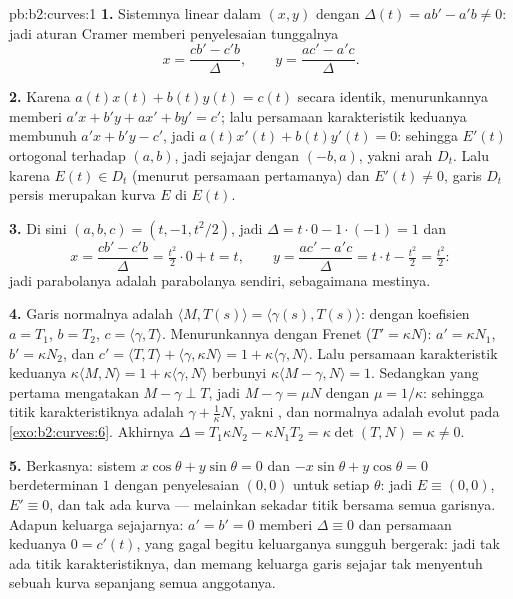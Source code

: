 \begin{solution}{pb:b2:curves:1}
\textbf{1.} Sistemnya linear dalam $(x, y)$ dengan 
$\Delta(t) = a b' - a'b \neq 0$: jadi aturan Cramer memberi
penyelesaian tunggalnya
\[
x = \frac{c b' - c' b}{\Delta}, \qquad
y = \frac{a c' - a' c}{\Delta}.
\]

\textbf{2.} Karena $a(t)x(t) + b(t)y(t) = c(t)$ secara identik,
menurunkannya memberi $a'x + b'y + ax' + by' = c'$; lalu
persamaan karakteristik keduanya membunuh $a'x + b'y - c'$, jadi
$a(t)x'(t) + b(t)y'(t) = 0$: sehingga $E'(t)$ ortogonal terhadap $(a,
b)$, jadi sejajar dengan $(-b, a)$, yakni arah $D_t$. Lalu karena
$E(t) \in D_t$ (menurut persamaan pertamanya) dan $E'(t) \neq 0$, garis
$D_t$ persis merupakan  kurva $E$ di $E(t)$.

\textbf{3.} Di sini $(a, b, c) = (t, -1, t^2/2)$, jadi $\Delta =
t\cdot0 - 1\cdot(-1) = 1$ dan
\[
x = \frac{c b' - c' b}{\Delta} = \tfrac{t^2}2\cdot 0 +
t = t, \qquad
y = \frac{a c' - a' c}{\Delta} = t\cdot t - \tfrac{t^2}2 =
\tfrac{t^2}2 :
\]
jadi   parabolanya adalah
parabolanya sendiri, sebagaimana mestinya.

\textbf{4.} Garis normalnya adalah $\langle M, T(s)\rangle =
\langle\gamma(s), T(s)\rangle$: dengan koefisien $a = T_1$, $b =
T_2$, $c = \langle\gamma, T\rangle$. Menurunkannya dengan
Frenet ($T' = \kappa N$): $a' = \kappa N_1$, $b' = \kappa
N_2$, dan $c' = \langle T, T\rangle + \langle\gamma, \kappa
N\rangle = 1 + \kappa\langle\gamma, N\rangle$. Lalu persamaan
karakteristik keduanya $\kappa\langle M, N\rangle = 1 +
\kappa\langle\gamma, N\rangle$ berbunyi $\kappa\langle M -
\gamma, N\rangle = 1$. Sedangkan yang pertama mengatakan $M - \gamma \perp T$,
jadi $M - \gamma = \mu N$ dengan $\mu = 1/\kappa$: sehingga
titik karakteristiknya adalah $\gamma + \frac1\kappa N$, yakni , dan  normalnya adalah evolut
pada \cref{exo:b2:curves:6}. Akhirnya $\Delta = T_1\kappa N_2 -
\kappa N_1 T_2 = \kappa\det(T, N) = \kappa \neq 0$.

\textbf{5.} Berkasnya: sistem $x\cos\theta + y\sin\theta =
0$ dan $-x\sin\theta + y\cos\theta = 0$ berdeterminan $1$ dengan
penyelesaian $(0,0)$ untuk setiap $\theta$: jadi $E \equiv (0,0)$, $E'
\equiv 0$, dan tak ada kurva --- melainkan sekadar titik bersama
semua garisnya. Adapun keluarga sejajarnya: $a' = b' = 0$ memberi
$\Delta \equiv 0$ dan persamaan keduanya $0 = c'(t)$, yang
gagal begitu keluarganya sungguh bergerak: jadi tak ada titik
karakteristiknya, dan memang keluarga garis sejajar tak menyentuh
sebuah kurva sepanjang semua anggotanya.


\end{solution}
